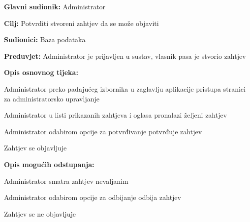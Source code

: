 					\noindent {}
					\begin{packed_item}
						
						\item \textbf{Glavni sudionik: } Administrator
						\item  \textbf{Cilj:} Potvrditi stvoreni zahtjev da se može objaviti
						\item  \textbf{Sudionici:} Baza podataka
						\item  \textbf{Preduvjet:} Administrator je prijavljen u sustav, vlasnik pasa je stvorio zahtjev
						\item  \textbf{Opis osnovnog tijeka:}
						
						\item[] \begin{packed_enum}
							
							\item Administrator preko padajućeg izbornika u zaglavlju aplikacije pristupa stranici za administratorsko upravljanje
							\item Administrator u listi prikazanih zahtjeva i oglasa pronalazi željeni zahtjev
							\item Administrator odabirom opcije za potvrđivanje potvrđuje zahtjev
							\item Zahtjev se objavljuje
							
						\end{packed_enum}
						\item  \textbf{Opis mogućih odstupanja:}
						
						\item[] \begin{packed_item}
							
							\item[3.a] Administrator smatra zahtjev nevaljanim
							\item[] \begin{packed_enum}
								
								\item Administrator odabirom opcije za odbijanje odbija zahtjev
								\item Zahtjev se ne objavljuje 
								
							\end{packed_enum}
							
						\end{packed_item}
					\end{packed_item}
					
